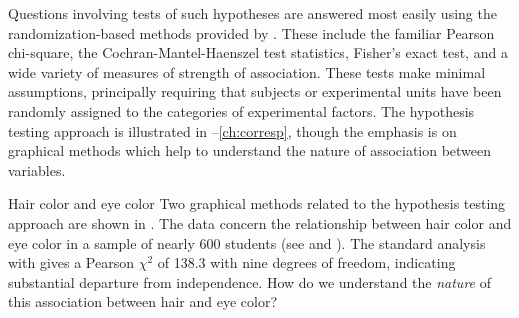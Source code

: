 Questions involving tests of such hypotheses are answered most easily
using the randomization-based methods provided by .
These include the familiar Pearson chi-square,
the Cochran-Mantel-Haenszel test statistics, Fisher's exact test, and a wide variety of measures of strength of association.
These tests make minimal assumptions, principally requiring that subjects
or experimental units have been randomly assigned to the categories of
experimental factors.  The hypothesis testing approach is illustrated
in --\ref{ch:corresp}, though the emphasis is on graphical
methods which help to understand the nature of association between
variables.
\begin{Example}[haireye0]{Hair color and eye color}
Two graphical methods related to the hypothesis testing approach
are shown in .
The data concern the relationship between hair color and eye color
in a sample of nearly 600 students (see  and ).
The standard analysis with  gives a 
Pearson \(\chi^2\) of 138.3 with nine degrees of freedom,
indicating substantial departure from independence.  How do we
understand the {\emph{nature}} of this association between hair
and eye color?


\end{Example}
